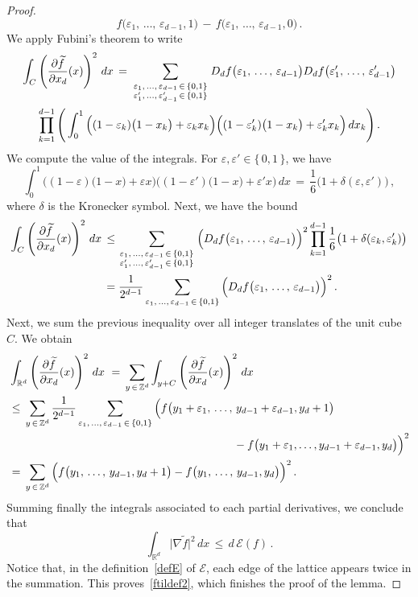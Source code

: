 \documentclass[10pt]{amsart}
\theoremstyle{definition}\newtheorem{defi}[theo]{Definition}\newtheorem{rema}[theo]{Remark}\newtheorem{exam}[theo]{Example}\newtheorem{exem}[theo]{Example}\newtheorem{nota}[theo]{Notation}
\newcommand{\tatop}[2]{\genfrac{}{}{0pt}{1}{#1}{#2}}
\newcommand*\Zd {{\mathbb Z^d}}
\newcommand*\Rd {{\mathbb R^d}}
\newcommand*\ft{\widetilde f}
\newcommand{\cE}{\mathcal{E}}
\begin{document}
\begin{proof}
\[f\big(\varepsilon_1,\,\dots,\,\varepsilon_{d-1},1\big)\,-\,
f\big(\varepsilon_1,\,\dots,\,\varepsilon_{d-1},0\big)\,.
\]
We apply Fubini's theorem to write
\begin{multline*}
\int_{C}
\left(\frac{\partial\ft}{\partial x_d}(x)\right)^2\,dx\,=\,
\sum_{\tatop{\varepsilon_1,\,\dots,\,\varepsilon_{d-1}\,\in\,\{0,1\}} {\varepsilon'_1,\,\dots,\,\varepsilon'_{d-1} \,\in\,\{0,1\}}} D_df\big(\varepsilon_1,\,\dots,\,\varepsilon_{d-1}\big) D_df\big(\varepsilon'_1,\,\dots,\,\varepsilon'_{d-1}\big)\\
\prod_{k=1}^{d-1}
\Bigg(\int_{0}^1
\Big((1-\varepsilon_k)\big(1-x_k\big) +\varepsilon_kx_k\Big)
\Big((1-\varepsilon'_k)\big(1-x_k\big) +\varepsilon'_kx_k\Big)\,dx_k\Bigg)
\,.
\end{multline*}
We compute the value of the integrals. For $\varepsilon,\varepsilon'\in\{\,0,1\,\}$, we have
\[
\int_{0}^1
\Big((1-\varepsilon)\big(1-x\big) +\varepsilon x\Big)
\Big((1-\varepsilon')\big(1-x\big) +\varepsilon'x\Big)\,dx\,=\,
\frac{1}{6}\big(1+\delta(
\varepsilon,\varepsilon')\big)\,,
\]
where $\delta$ is the Kronecker symbol. Next, we have the bound
\begin{align*}
\int_{C}
\left(\frac{\partial\ft}{\partial x_d}(x)\right)^2\,dx\,& \leq
\sum_{\tatop{\varepsilon_1,\,\dots,\,\varepsilon_{d-1}\,\in\,\{0,1\}} {\varepsilon'_1,\,\dots,\,\varepsilon'_{d-1} \,\in\,\{0,1\}}}
\Big(D_df\big(\varepsilon_1,\,\dots,\,\varepsilon_{d-1}\big)\Big)^2
\prod_{k=1}^{d-1}
\frac{1}{6}\big(1+\delta(
\varepsilon_k,\varepsilon'_k)
\big)\\
& =
\frac{1}{2^{d-1}}
\sum_{{\varepsilon_1,\,\dots,\,\varepsilon_{d-1}\,\in\,\{0,1\}}}
\Big(D_df\big(\varepsilon_1,\,\dots,\,\varepsilon_{d-1}\big)\Big)^2
\,.
\end{align*}
Next, we sum the previous inequality over all integer translates of the unit cube~$C$. We obtain
\begin{align*}
& \int_{\Rd}
\left(\frac{\partial\ft}{\partial x_d}(x)\right)^2\,dx\,
\,=\,\sum_{y\,\in\,\Zd}
\int_{y+C}
\left(\frac{\partial\ft}{\partial x_d}(x)\right)^2\,dx\,
\\
& \leq\,
\sum_{y\,\in\,\Zd}
\frac{1}{2^{d-1}}
\sum_{{\varepsilon_1,\,\dots,\,\varepsilon_{d-1}\,\in\,\{0,1\}}}
\Big(f\big(y_1+\varepsilon_1,\,\dots,\,y_{d-1}+\varepsilon_{d-1},y_d+1\big)
\\
&
\kern200pt -f\big(y_1+\varepsilon_1,\dots,y_{d-1}+\varepsilon_{d-1},y_d\big)
\Big)^2\\
& =\,
\sum_{y\,\in\,\Zd}
\Big(f\big(y_1,\,\dots,\,y_{d-1},y_d+1\big) -f\big(y_1,\,\dots,\,y_{d-1},y_d\big)
\Big)^2
\,.
\end{align*}
Summing finally the integrals associated to each partial derivatives, we conclude that
\[
\int_{\Rd}\big|\nabla \ft\big|^2\,dx\,\leq\,d\,\cE(f)\,.
\]
Notice that, in the definition~\eqref{defE} of $\cE$, each edge of the lattice appears twice in the summation. This proves~\eqref{ftildef2}, which finishes the proof of the lemma.
\end{proof}
\end{document}
